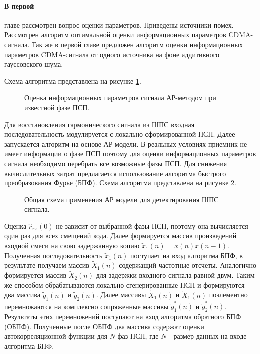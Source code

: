 \paragraph{В первой} главе рассмотрен вопрос оценки параметров. Приведены источники помех. Рассмотрен алгоритм оптимальной оценки информационных параметров CDMA-сигнала.
Так же в первой главе предложен алгоритм оценки информационных параметров CDMA-сигнала от одного источника  на фоне аддитивного гауссовского  шума.

Схема алгоритма представлена на рисунке \ref{pic:ar_cdma1_scheme1}.

\begin{figure}[h]
	\center{}
	\caption{Оценка информационных параметров сигнала АР-методом при известной фазе ПСП.}
	\label{pic:ar_cdma1_scheme1}
\end{figure}

Для восстановления гармонического сигнала из ШПС входная последовательность модулируется с локально сформированной ПСП.
Далее запускается алгоритм на основе АР-модели. В реальных условиях приемник не имеет информации о фазе ПСП поэтому для оценки информационных параметров 
сигнала необходимо перебрать все возможные фазы ПСП. Для снижения вычислительных затрат предлагается использование алгоритма быстрого преобразования Фурье (БПФ).
Схема алгоритма представлена на рисунке \ref{pic:ar_cdma1_scheme2}.

\begin{figure}[h]
	\center{}
	\caption{Общая схема применения АР модели для детектирования ШПС сигнала.}
	\label{pic:ar_cdma1_scheme2}
\end{figure}

Оценка ${\hat{r}_{xx}(0)}$ не зависит от выбранной фазы ПСП, поэтому она вычисляется один
раз для всех смещений кода. Далее формируется массив произведений входной смеси на
свою задержанную копию ${\tilde{x}_1(n)=x(n)x(n-1)}$. Полученная последовательность  
${\tilde{x}_1(n)}$ поступает на вход алгоритма БПФ, в результате получаем массив ${\tilde{X}_1(n)}$
содержащий частотные отсчеты. Аналогично формируется массив  ${\tilde{X}_2(n)}$ для
задержки входного сигнала равной двум. Таким же способом обрабатываются локально
сгенерированные ПСП и формируются два массива ${\tilde{g}_1(n)}$ и ${\tilde{g}_2(n)}$.
Далее массивы ${\tilde{X}_1(n)}$ и ${\tilde{X}_1(n)}$ поэлементно перемножаются
на комплексно сопряженные массивы ${\tilde{g}_1^*(n)}$ и ${\tilde{g}_2^*(n)}$.
Результаты этих перемножений поступают на вход алгоритма обратного
БПФ (ОБПФ). Полученные после ОБПФ два массива содержат оценки автокорреляционной функции для ${N}$ 
фаз ПСП, где  ${N}$ - размер данных на входе алгоритма БПФ.

